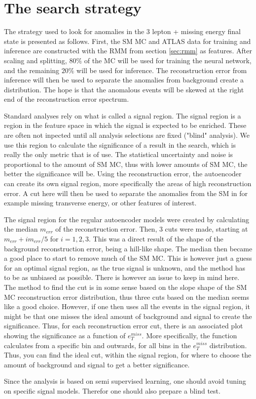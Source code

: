 \section{The search strategy}\label{sec:strategy}
The strategy used to look for anomalies in the 3 lepton + missing energy final state is presented as follows. 
First, the SM MC and ATLAS data for training and inference are constructed with the RMM from section 
\ref{sec:rmm} as features. After scaling and splitting, $80\%$ of the MC will be used for training the neural 
network, and the remaining $20\%$ will be used for inference. The reconstruction error 
from inference will then be used to separate the anomalies from background create a distribution. The hope is that the anomalous events will 
be skewed at the right end of the reconstruction error spectrum.\par
Standard analyses rely on what is called a signal region. The signal region is a region in the feature space in which
the signal is expected to be enriched. These are often not inpected until all analysis selections are fixed ("blind" analysis). 
We use this region to calculate the significance of a result in the search, which is 
really the only metric that is of use. The statistical uncertainty and noise is proportional to the amount of SM MC, 
thus with lower amounts of SM MC, the better the significance will be. Using the reconstruction error, the autoencoder 
can create its own signal region, more specifically the areas of high reconstruction error. A cut here will then be used to 
separate the anomalies from the SM in for example missing transverse energy, or other features of interest. \par 
The signal region for the regular autoencoder models were created by calculating the median $m_{err}$ of the 
reconstruction error. Then, 3 cuts were made, starting at $m_{err} + im_{err}/5$ for $i = 1,2,3$. This was a direct 
result of the shape of the background reconstruction error, being a hill-like shape. The median then became a 
good place to start to remove much of the SM MC. This is however just a guess for an optimal signal region, 
as the true signal is unknown, and the method has to be as unbiased as possible. There is however an issue to keep 
in mind here. The method to find the cut is in some sense based on the slope shape of the SM MC reconstruction 
error distribution, thus three cuts based on the median seems like a good choice. However, if one then uses all 
the events in the signal region, it might be that one misses the ideal amount of background and signal to create 
the significance. Thus, for each reconstruction error cut, there is an associated plot showing the significance 
as a function of $e_T^{miss}$. More specifically, the function calculates from a specific bin and outwards, for all 
bins in the $e_T^{miss}$ distribution. Thus, you can find the ideal cut, within the signal region, for where to 
choose the amount of background and signal to get a better significance.\par 

Since the analysis is based on semi supervised learning, one should avoid tuning on specific signal models.
Therefor one should also prepare a blind test. 
